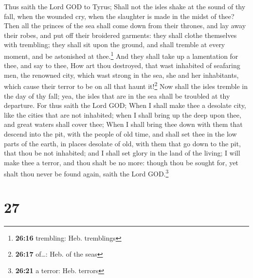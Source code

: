  Thus saith the Lord GOD to Tyrus; Shall not the isles
shake at the sound of thy fall, when the wounded cry, when the slaughter
is made in the midst of thee?  Then all the princes of
the sea shall come down from their thrones, and lay away their robes,
and put off their broidered garments: they shall clothe themselves with
trembling; they shall sit upon the ground, and shall tremble at every
moment, and be astonished at thee.\footnote{\textbf{26:16} trembling:
  Heb. tremblings}  And they shall take up a lamentation
for thee, and say to thee, How art thou destroyed, that wast inhabited
of seafaring men, the renowned city, which wast strong in the sea, she
and her inhabitants, which cause their terror to be on all that haunt
it!\footnote{\textbf{26:17} of\ldots: Heb. of the seas} 
Now shall the isles tremble in the day of thy fall; yea, the isles that
are in the sea shall be troubled at thy departure.  For
thus saith the Lord GOD; When I shall make thee a desolate city, like
the cities that are not inhabited; when I shall bring up the deep upon
thee, and great waters shall cover thee;  When I shall
bring thee down with them that descend into the pit, with the people of
old time, and shall set thee in the low parts of the earth, in places
desolate of old, with them that go down to the pit, that thou be not
inhabited; and I shall set glory in the land of the living;
 I will make thee a terror, and thou shalt be no more:
though thou be sought for, yet shalt thou never be found again, saith
the Lord GOD.\footnote{\textbf{26:21} a terror: Heb. terrors}

\hypertarget{section-26}{%
\section{27}\label{section-26}}

